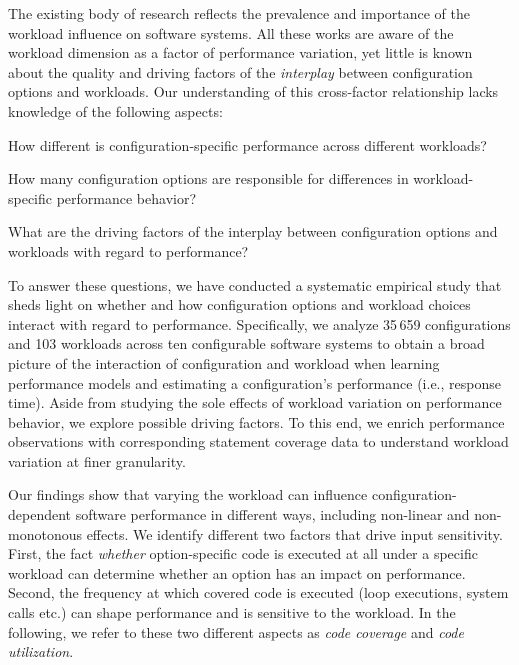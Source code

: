 The existing body of research reflects the prevalence and importance of the workload influence on software systems. All these works are aware of the workload dimension as a factor of performance variation, yet little is known about the quality and driving factors of the \emph{interplay} between configuration options and workloads. Our understanding of this cross-factor relationship lacks knowledge of the following aspects:

\begin{compactitem}
	\item How different is configuration-specific performance across different workloads? 
	\item How many configuration options are responsible for differences in workload-specific performance behavior?
	\item What are the driving factors of the interplay between configuration options and workloads with regard to performance? 
\end{compactitem}

To answer these questions, we have conducted a systematic empirical study that sheds light on whether and how configuration options and workload choices interact with regard to performance. 
Specifically, we analyze 35\,659 configurations and 103 workloads across ten configurable software systems to obtain a broad picture of the interaction of configuration and workload when learning performance models and estimating a configuration's performance (i.e., response time). Aside from studying the sole effects of workload variation on performance behavior, we explore possible driving factors. To this end, we enrich performance observations with corresponding statement coverage data to understand workload variation at finer granularity.

Our findings show that varying the workload can influence con\-fi\-gu\-ra\-tion-de\-pen\-dent software performance in different ways, including non-linear and non-monotonous effects. 
We identify different two factors that drive input sensitivity. First, the fact \textit{whether} option-specific code is executed at all under a specific workload can determine whether an option has an impact on performance. Second, the frequency at which covered code is executed (loop executions, system calls etc.) can shape performance and is sensitive to the workload. In the following, we refer to these two different aspects as \textit{code coverage} and \textit{code utilization}.


